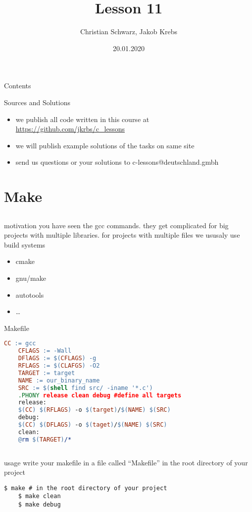 \documentclass[10pt,graphics,aspectratio=169,table]{beamer}
\title{Lesson 11}
\author{Christian Schwarz, Jakob Krebs}
\date{20.01.2020}
\begin{document}
\maketitle

\begin{frame}{Contents}
    \tableofcontents
\end{frame}

\begin{frame}{Sources and Solutions}
    \begin{itemize}
        \item we publish all code written in this course at \url{https://github.com/jkrbs/c_lessons}
        \item we will publish example solutions of the tasks on same site
        \item send us questions or your solutions to c-lessons@deutschland.gmbh
    \end{itemize}
\end{frame}



\section{Make}
\subsection{}

\begin{frame}{motivation}
  you have seen the gcc commands.
  \bigskip
  they get complicated for big projects with multiple libraries.
\bigskip
for projects with multiple files we ususaly use build systems  
\begin{itemize}
    \item cmake
    \item gnu/make
    \item autotools
    \item \ldots
  \end{itemize}
\end{frame}

\begin{frame}[fragile]{Makefile}
    \begin{lstlisting}[language=make]
    CC := gcc
    CFLAGS := -Wall
    DFlAGS := $(CFLAGS) -g
    RFLAGS := $(CLAFGS) -O2
    TARGET := target
    NAME := our_binary_name
    SRC := $(shell find src/ -iname '*.c')
    .PHONY release clean debug #define all targets 
    release: 
    $(CC) $(RFLAGS) -o $(target)/$(NAME) $(SRC)
    debug:
    $(CC) $(DFLAGS) -o $(taget)/$(NAME) $(SRC)
    clean:
    @rm $(TARGET)/*
    
  \end{lstlisting}
\end{frame}

\begin{frame}[fragile]{usage}
  write your makefile in a file called \enquote{Makefile} in the root directory
  of your project
  
    \begin{lstlisting}[numbers=none]
    $ make # in the root directory of your project
    $ make clean
    $ make debug
  \end{lstlisting}
  
\end{frame}
\end{document}
